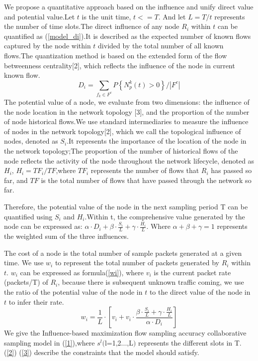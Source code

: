 \documentclass[conference]{IEEEtran}
\begin{document}
We propose a quantitative approach based on the influence and unify direct value and potential value.Let $t$ is the unit time, $t<=T$. And let $L = T/t$ represents the number of time slots.The direct influence of any node $R_i$ within $t$ can be quantified as (\ref{model_di}).It is described as the expected number of known flows captured by the node within $t$ divided by the total number of all known flows.The quantization method is based on the extended form of the flow betweenness centrality[2], which reflects the influence of the node in current known flow.
\begin{equation}
D_i= \sum\limits_{{{f}_{k}}\in {{F}^{c}}}{P\left\{ N_{p}^{k}\left( t \right)>0 \right\}} /|F^c|
\label{model_di}
\end{equation}
The potential value of a node, we evaluate from two dimensions: the influence of the node location in the network topology [3], and the proportion of the number of node historical flows.We use standard intermediaries to measure the influence of nodes in the network topology[2], which we call the topological influence of nodes, denoted as $S_i$.It represents the importance of the location of the node in the network topology;The proportion of the number of historical flows of the node reflects the activity of the node throughout the network lifecycle, denoted as $H_i$, $H_i=TF_i/TF$,where $TF_i$ represents the number of flows that $R_i$ has passed so far, and $TF$ is the total number of flows that have passed through the network so far.

Therefore, the potential value of the node in the next sampling period T can be quantified using $S_i$ and $H_i$.Within t, the comprehensive  value generated by the node can be expressed as: $\alpha \cdot D_i +  \beta \cdot \frac{S_i}{L} + \gamma \cdot \frac{H_i}{L}$. Where $\alpha + \beta + \gamma =1$ represents the weighted sum of the three influences.

The cost of a node is the total number of sample packets generated at a given time. We use $w_i$ to represent the total number of packets generated by $R_i$ within $t$. $w_i$ can be expressed as formula(\ref{wi}), where $v_i$ is the current packet rate (packets/T) of $R_i$, because there is subsequent unknown traffic coming, we use the ratio of the potential value of the node in $t$ to the direct value of the node in $t$ to infer their rate.
\begin{equation}
{{w}_{i}}= \frac{1}{L} \cdot [v_i + v_i \cdot \frac{\beta \cdot \frac{S_i}{L} + \gamma \cdot \frac{H_i}{L}}{\alpha \cdot D_i}]
\label{wi}
\end{equation}
We give the Influence-based maximization flow sampling accuracy collaborative sampling model in (\ref{1}),where ${{s}^{l}}($l=1,2...,L$)$ represents the different slots in T. (\ref{2}) (\ref{3}) describe the constraints that the model should satisfy. 
\end{document}

